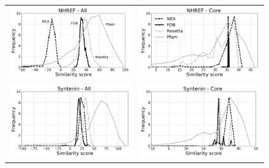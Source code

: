 \documentclass[a4paper,12pt]{article}
\begin{document}
   \begin{figure}[t]
     \centering
     \begin{tabular}{cc}
       \includegraphics[width=8.4cm]{rapport/resultats/PDZ/graphe/exactGB/1G9O_simil_cut.png} &
       \includegraphics[width=8.4cm]{rapport/resultats/PDZ/graphe/exactGB/1G9O_simil_core.png} \\
       \includegraphics[width=8.4cm]{rapport/resultats/PDZ/graphe/exactGB/1R6J_simil_cut.png} &
       \includegraphics[width=8.4cm]{rapport/resultats/PDZ/graphe/exactGB/1R6J_simil_core.png} \\

\end{tabular}
\end{figure}
\end{document}
